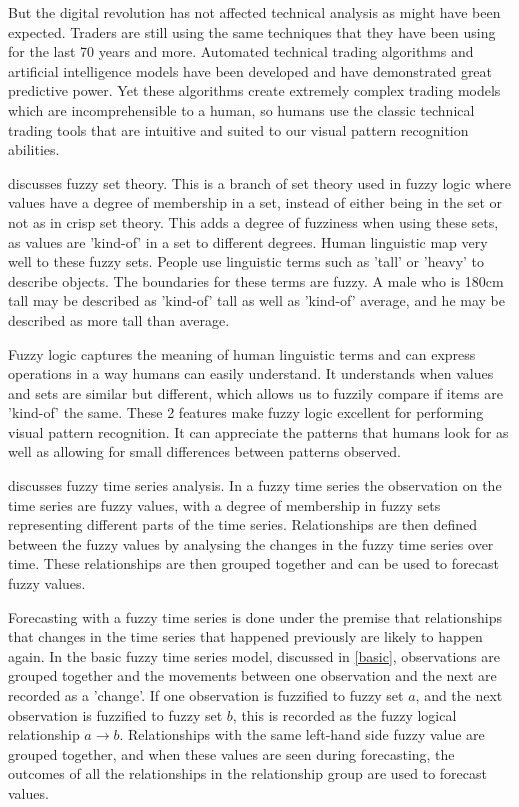 \documentclass{article}
\theoremstyle{definition}
\begin{document}
But the digital revolution has not affected technical analysis as might have been expected. Traders are still using the same techniques that they have been using for the last 70 years and more. Automated technical trading algorithms and artificial intelligence models have been developed and have demonstrated great predictive power. Yet these algorithms create extremely complex trading models which are incomprehensible to a human, so humans use the classic technical trading tools that are intuitive and suited to our visual pattern recognition abilities.

 discusses fuzzy set theory. This is a branch of set theory used in fuzzy logic where values have a degree of membership in a set, instead of either being in the set or not as in crisp set theory. This adds a degree of fuzziness when using these sets, as values are 'kind-of' in a set to different degrees. Human linguistic map very well to these fuzzy sets. People use linguistic terms such as 'tall' or 'heavy' to describe objects. The boundaries for these terms are fuzzy. A male who is 180cm tall may be described as 'kind-of' tall as well as 'kind-of' average, and he may be described as more tall than average.

Fuzzy logic captures the meaning of human linguistic terms and can express operations in a way humans can easily understand. It understands when values and sets are similar but different, which allows us to fuzzily compare if items are 'kind-of' the same. These 2 features make fuzzy logic excellent for performing visual pattern recognition. It can appreciate the patterns that humans look for as well as allowing for small differences between patterns observed.

 discusses fuzzy time series analysis. In a fuzzy time series the observation on the time series are fuzzy values, with a degree of membership in fuzzy sets representing different parts of the time series. Relationships are then defined between the fuzzy values by analysing the changes in the fuzzy time series over time. These relationships are then grouped together and can be used to forecast fuzzy values.

Forecasting with a fuzzy time series is done under the premise that relationships that changes in the time series that happened previously are likely to happen again. In the basic fuzzy time series model, discussed in \cref{basic}, observations are grouped together and the movements between one observation and the next are recorded as a 'change'. If one observation is fuzzified to fuzzy set $a$, and the next observation is fuzzified to fuzzy set $b$, this is recorded as the fuzzy logical relationship $a \rightarrow b$. Relationships with the same left-hand side fuzzy value are grouped together, and when these values are seen during forecasting, the outcomes of all the relationships in the relationship group are used to forecast values.
\end{document}
